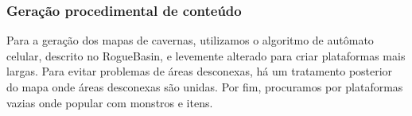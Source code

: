     
    \subsubsection{Geração procedimental de conteúdo}
      Para a geração dos mapas de cavernas, utilizamos o algoritmo de autômato celular, descrito no RogueBasin,
      \cite{roguebasin:cellularautomata} e levemente alterado para criar plataformas mais largas. Para
      evitar problemas de áreas desconexas, há um tratamento posterior do mapa onde áreas desconexas são unidas.
      Por fim, procuramos por plataformas vazias onde popular com monstros e itens.